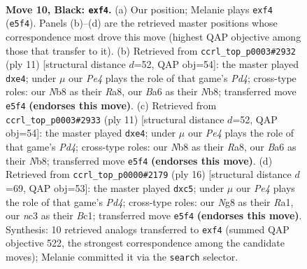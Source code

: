 \documentclass[11pt]{article}
\begin{document}
\clearpage

\begin{figure}[p]\centering
\begin{subfigure}{0.46\textwidth}\centering
\resizebox{\linewidth}{!}{%
\newchessgame
\chessboard[
  setfen={rn1qkbnr/3p3p/b4pp1/2pPp3/4PPPP/2N5/PP6/R1BQKBNR b KQkq - 0 10},
  showmover=false,
  pgfstyle=straightmove, color=movearrow, markmove={e5-f4}
]}
\caption{}
\end{subfigure}\hfill
\begin{subfigure}{0.46\textwidth}\centering
\resizebox{\linewidth}{!}{%
\newchessgame
\chessboard[
  setfen={rnbqkb1r/ppp2p1p/5np1/3p4/3PP3/2N2P2/PP4PP/R1BQKBNR b KQkq - 1 6},
  showmover=false,
  pgfstyle=straightmove, color=movearrow, markmove={d5-e4}
]}
\caption{}
\end{subfigure}
\\[4pt]
\begin{subfigure}{0.46\textwidth}\centering
\resizebox{\linewidth}{!}{%
\newchessgame
\chessboard[
  setfen={rnbqkb1r/ppp2p1p/5np1/3p4/3PP3/2N2P2/PP4PP/R1BQKBNR b KQkq - 1 6},
  showmover=false,
  pgfstyle=straightmove, color=movearrow, markmove={d5-e4}
]}
\caption{}
\end{subfigure}\hfill
\begin{subfigure}{0.46\textwidth}\centering
\resizebox{\linewidth}{!}{%
\newchessgame
\chessboard[
  setfen={r1bqk2r/pp3ppp/2nb1p2/2p5/3P4/2PB4/PP2NPPP/R1BQK2R w KQkq - 2 9},
  showmover=false,
  pgfstyle=straightmove, color=movearrow, markmove={d4-c5}
]}
\caption{}
\end{subfigure}
\caption{\textbf{Move 10, Black: \texttt{exf4}.} (a) Our position; Melanie plays \texttt{exf4} (\texttt{e5f4}). Panels (b)--(d) are the retrieved master positions whose correspondence most drove this move (highest QAP objective among those that transfer to it). (b) Retrieved from \texttt{ccrl\_top\_p0003\#2932} (ply 11) [structural distance $d$=52, QAP obj=54]: the master played \texttt{dxe4}; under $\mu$ our \emph{Pe4} plays the role of that game's \emph{Pd4}; cross-type roles: our \emph{N}b8 as their \emph{R}a8, our \emph{B}a6 as their \emph{N}b8; transferred move \texttt{e5f4} \textbf{(endorses this move)}. (c) Retrieved from \texttt{ccrl\_top\_p0003\#2933} (ply 11) [structural distance $d$=52, QAP obj=54]: the master played \texttt{dxe4}; under $\mu$ our \emph{Pe4} plays the role of that game's \emph{Pd4}; cross-type roles: our \emph{N}b8 as their \emph{R}a8, our \emph{B}a6 as their \emph{N}b8; transferred move \texttt{e5f4} \textbf{(endorses this move)}. (d) Retrieved from \texttt{ccrl\_top\_p0000\#2179} (ply 16) [structural distance $d$=69, QAP obj=53]: the master played \texttt{dxc5}; under $\mu$ our \emph{Pe4} plays the role of that game's \emph{Pd4}; cross-type roles: our \emph{N}g8 as their \emph{R}a1, our \emph{n}c3 as their \emph{B}c1; transferred move \texttt{e5f4} \textbf{(endorses this move)}. Synthesis: 10 retrieved analogs transferred to \texttt{exf4} (summed QAP objective 522, the strongest correspondence among the candidate moves); Melanie committed it via the \texttt{search} selector.}
\label{fig:thought-m19}
\end{figure}
\end{document}
